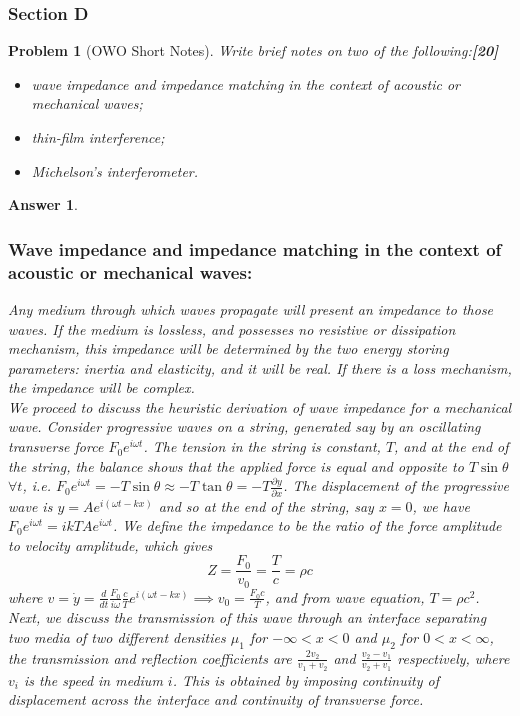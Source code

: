 \documentclass[a4paper]{article}
\newtheorem{ans}{Answer}[subsection]
\theoremstyle{new}
\newtheorem{qns}{Problem}[subsection]
\begin{document}
\subsubsection{Section D}
\begin{qns}[OWO Short Notes]
Write brief notes on two of the following:\hfill\textbf{[20]}
\begin{itemize}
    \item wave impedance and impedance matching in the context of acoustic or mechanical waves;
    \item thin-film interference;
    \item Michelson's interferometer.
\end{itemize}
\end{qns}
\begin{ans}\leavevmode
\subsubsection*{Wave impedance and impedance matching in the context of acoustic or mechanical waves:}
Any medium through which waves propagate will present an impedance to those waves. If the medium is lossless, and possesses no resistive or dissipation mechanism, this impedance will be determined by the two energy storing parameters: inertia and elasticity, and it will be real. If there is a loss mechanism, the impedance will be complex.\\[5pt]
We proceed to discuss the heuristic derivation of wave impedance for a mechanical wave. Consider progressive waves on a string, generated say by an oscillating transverse force $F_0e^{i\omega t}$. The tension in the string is constant, $T$, and at the end of the string, the balance shows that the applied force is equal and opposite to $T\sin\theta$ $\forall t$, i.e. $F_0e^{i\omega t}=-T\sin\theta\approx -T\tan\theta=-T\frac{\partial y}{\partial x}$. The displacement of the progressive wave is $y=Ae^{i(\omega t-kx)}$ and so at the end of the string, say $x=0$, we have $F_0e^{i\omega t}=ikTAe^{i\omega t}$. We define the impedance to be the ratio of the force amplitude to velocity amplitude, which gives
$$Z=\frac{F_0}{v_0}=\frac{T}{c}=\rho c$$
where $v=\dot{y}=\frac{d}{dt}\frac{F_0}{i\omega}\frac{c}{T}e^{i(\omega t-kx)}\implies v_0=\frac{F_0c}{T}$, and from wave equation, $T=\rho c^2$.\\[5pt]
Next, we discuss the transmission of this wave through an interface separating two media of two different densities $\mu_1$ for $-\infty<x<0$ and $\mu_2$ for $0<x<\infty$, the transmission and reflection coefficients are $\frac{2v_2}{v_1+v_2}$ and $\frac{v_2-v_1}{v_2+v_1}$ respectively, where $v_i$ is the speed in medium $i$. This is obtained by imposing continuity of displacement across the interface and continuity of transverse force.\\[5pt]

\end{ans}
\end{document}

